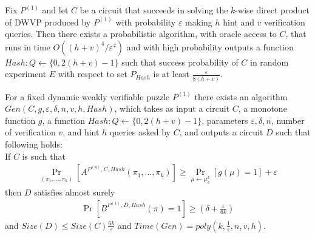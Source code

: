 %
%
\begin{lemma}
Fix $P^{(1)}$ and let $C$ be a circuit that succeeds in solving the $k$-wise direct product of DWVP produced by $P^{(1)}$
with probability $\varepsilon$ making $h$ hint and $v$ verification queries.
Then there exists a probabilistic algorithm, with oracle access to $C$, that runs in time $O((h+v)^4/\varepsilon^4)$
and with high probability outputs a function $Hash: Q \leftarrow \{0, 2(h+v)-1\}$ such that success probability of
$C$ in random experiment $E$ with respect to set $P_{Hash}$ is at least $\frac{\varepsilon}{8(h+v)}$.
\end{lemma}
%
%
%
\begin{lemma}
  For a fixed dynamic weakly verifiable puzzle $P^{(1)}$ there exists an algorithm\\
  $Gen(C, g, \varepsilon, \delta, n, v, h, Hash)$, which takes as input a circuit $C$, a monotone function $g$,
  a function $Hash : Q \leftarrow \{0, 2(h+v)-1\}$, parameters $\varepsilon, \delta, n$,
  number of verification $v$, and hint $h$ queries asked by $C$, and outputs a circuit $D$
  such that following holds: \\
  If $C$ is such that \\
  \begin{align*}
    \underset{(\pi_1, \dots, \pi_k)}{\Pr}[A^{P^{(g)}, C, Hash}(\pi_1, \dots, \pi_k)] \geq \underset{\mu \leftarrow \mu_\delta^k}{\Pr}[g(\mu) = 1] + \varepsilon
  \end{align*}
  then $D$ satisfies almost surely
  \begin{align*}
    \underset{}{\Pr}[B^{P^{(1)},D, Hash}(\pi) = 1] \geq (\delta + \frac{\varepsilon}{6k})
  \end{align*}
  and $Size(D) \leq Size(C)\frac{6k}{\varepsilon}$ and $Time(Gen) = poly(k, \frac{1}{\varepsilon}, n, v, h)$.
\end{lemma}
%

